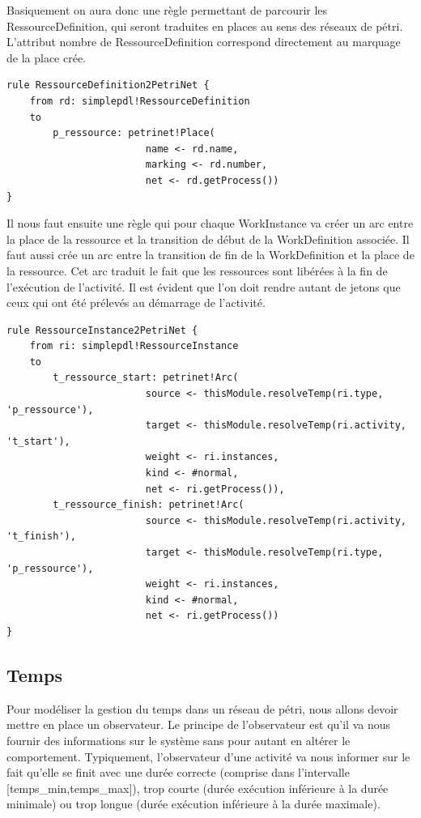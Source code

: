 \documentclass{report}
\begin{document}
Basiquement on aura donc une règle permettant de parcourir les RessourceDefinition, qui seront traduites en places au sens des réseaux de pétri. L'attribut nombre de RessourceDefinition correspond directement au marquage de la place crée.

\begin{verbatim}
rule RessourceDefinition2PetriNet {
	from rd: simplepdl!RessourceDefinition
	to
		p_ressource: petrinet!Place(
						name <- rd.name,
						marking <- rd.number,
						net <- rd.getProcess())
}
\end{verbatim}

Il nous faut ensuite une règle qui pour chaque WorkInstance va créer un arc entre la place de la ressource et la transition de début de la WorkDefinition associée.
Il faut aussi crée un arc entre la transition de fin de la WorkDefinition et la place de la ressource. Cet arc traduit le fait que les ressources sont libérées à la fin de l'exécution de l'activité. Il est évident que l'on doit rendre autant de jetons que ceux qui ont été prélevés au démarrage de l'activité.

\begin{verbatim}
rule RessourceInstance2PetriNet {
	from ri: simplepdl!RessourceInstance
	to
		t_ressource_start: petrinet!Arc(
						source <- thisModule.resolveTemp(ri.type, 'p_ressource'),
						target <- thisModule.resolveTemp(ri.activity, 't_start'),
						weight <- ri.instances,
						kind <- #normal,
						net <- ri.getProcess()),
		t_ressource_finish: petrinet!Arc(
						source <- thisModule.resolveTemp(ri.activity, 't_finish'),
						target <- thisModule.resolveTemp(ri.type, 'p_ressource'),
						weight <- ri.instances,
						kind <- #normal,
						net <- ri.getProcess())
}
\end{verbatim}

\subsection{Temps}

Pour modéliser la gestion du temps dans un réseau de pétri, nous allons devoir mettre en place un observateur. Le principe de l'observateur est qu'il va nous fournir des informations sur le système sans pour autant en altérer le comportement. Typiquement, l'observateur d'une activité va nous informer sur le fait qu'elle se finit avec une durée correcte (comprise dans l'intervalle [temps\_min,temps\_max]), trop courte (durée exécution inférieure à la durée minimale) ou trop longue (durée exécution inférieure à la durée maximale).
\end{document}
